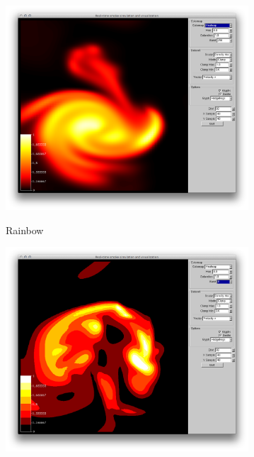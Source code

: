 \begin{figure}[htbp]
\centering
\begin{minipage}[t]{0.48\textwidth}
        \includegraphics[height=3in]{figures/colormaps/heatmapSmoke.png}
\caption{Rainbow}
\label{fig:revised:modelingLanguages}
\end{minipage}\hspace{.04\textwidth}%
\begin{minipage}[t]{0.48\textwidth}
        \includegraphics[height=3in]{figures/colormaps/heatmapSmokeBanded.png}
    \caption{}
    \label{fig:revised:reqFormat}
\end{minipage}
\end{figure}

